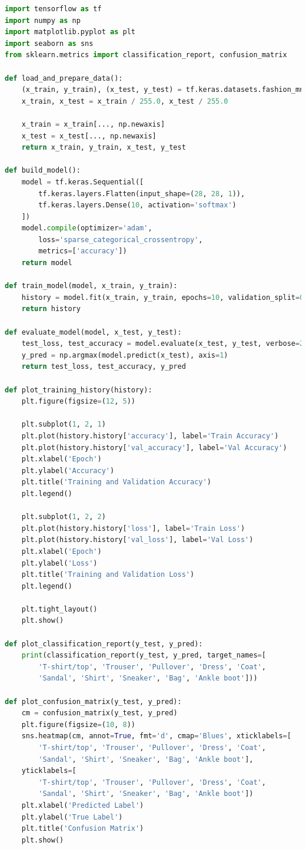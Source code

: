 \documentclass[a4paper,12pt]{article}
\begin{document}
\begin{lstlisting}[language=Python, caption=Softmax回归模型Python代码]
import tensorflow as tf
import numpy as np
import matplotlib.pyplot as plt
import seaborn as sns
from sklearn.metrics import classification_report, confusion_matrix

def load_and_prepare_data():
	(x_train, y_train), (x_test, y_test) = tf.keras.datasets.fashion_mnist.load_data()
	x_train, x_test = x_train / 255.0, x_test / 255.0  

	x_train = x_train[..., np.newaxis]
	x_test = x_test[..., np.newaxis]
	return x_train, y_train, x_test, y_test

def build_model():
	model = tf.keras.Sequential([
		tf.keras.layers.Flatten(input_shape=(28, 28, 1)),
		tf.keras.layers.Dense(10, activation='softmax')
	])
	model.compile(optimizer='adam',
		loss='sparse_categorical_crossentropy',
		metrics=['accuracy'])
	return model

def train_model(model, x_train, y_train):
	history = model.fit(x_train, y_train, epochs=10, validation_split=0.2, verbose=2)
	return history

def evaluate_model(model, x_test, y_test):
	test_loss, test_accuracy = model.evaluate(x_test, y_test, verbose=2)
	y_pred = np.argmax(model.predict(x_test), axis=1)
	return test_loss, test_accuracy, y_pred

def plot_training_history(history):
	plt.figure(figsize=(12, 5))

	plt.subplot(1, 2, 1)
	plt.plot(history.history['accuracy'], label='Train Accuracy')
	plt.plot(history.history['val_accuracy'], label='Val Accuracy')
	plt.xlabel('Epoch')
	plt.ylabel('Accuracy')
	plt.title('Training and Validation Accuracy')
	plt.legend()

	plt.subplot(1, 2, 2)
	plt.plot(history.history['loss'], label='Train Loss')
	plt.plot(history.history['val_loss'], label='Val Loss')
	plt.xlabel('Epoch')
	plt.ylabel('Loss')
	plt.title('Training and Validation Loss')
	plt.legend()

	plt.tight_layout()
	plt.show()

def plot_classification_report(y_test, y_pred):
	print(classification_report(y_test, y_pred, target_names=[
		'T-shirt/top', 'Trouser', 'Pullover', 'Dress', 'Coat',
		'Sandal', 'Shirt', 'Sneaker', 'Bag', 'Ankle boot']))

def plot_confusion_matrix(y_test, y_pred):
	cm = confusion_matrix(y_test, y_pred)
	plt.figure(figsize=(10, 8))
	sns.heatmap(cm, annot=True, fmt='d', cmap='Blues', xticklabels=[
		'T-shirt/top', 'Trouser', 'Pullover', 'Dress', 'Coat',
		'Sandal', 'Shirt', 'Sneaker', 'Bag', 'Ankle boot'],
	yticklabels=[
		'T-shirt/top', 'Trouser', 'Pullover', 'Dress', 'Coat',
		'Sandal', 'Shirt', 'Sneaker', 'Bag', 'Ankle boot'])
	plt.xlabel('Predicted Label')
	plt.ylabel('True Label')
	plt.title('Confusion Matrix')
	plt.show()


\end{lstlisting}
\end{document}
